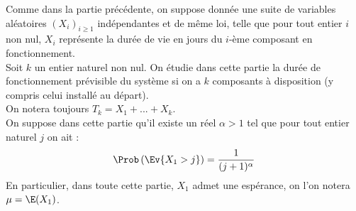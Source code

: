 \noindent 
Comme dans la partie précédente, on suppose donnée une suite de
variables aléatoires $(X_{i})_{i \geq 1}$ indépendantes et de même
loi, telle que pour tout entier $i$ non nul, $X_{i}$ représente la
durée de vie en jours du $i$-ème composant en fonctionnement.\\
Soit $k$ un entier naturel non nul. On étudie dans cette partie la
durée de fonctionnement prévisible du système si on a $k$ composants à
disposition (y compris celui installé au départ). \\
On notera toujours $T_{k} = X_{1} +... + X_{k}$.\\
On suppose dans cette partie qu'il existe un réel $\alpha >1$ tel que
pour tout entier naturel $j$ on ait :
\[
\Prob\left(\Ev{X_{1} >j}\right) = \frac{1}{(j + 1)^{\alpha}}
\]
En particulier, dans toute cette partie, $X_{1}$ admet une espérance,
on l'on notera $\mu = \E(X_{1})$.
